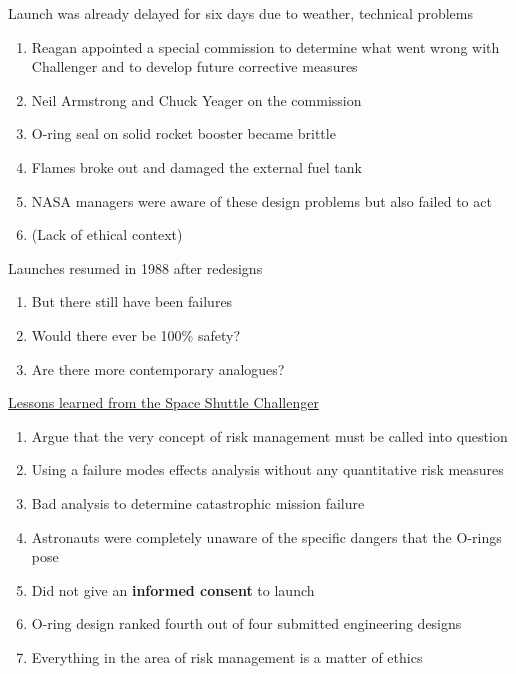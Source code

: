 \documentclass[aspectratio=1610,pdftex,dvipsnames,compress,xcolor={dvipsnames}]{beamer}
\begin{document}
\begin{frame}{Launch was already delayed for six days due to weather, technical problems}
    \begin{enumerate}[series=outerlist,topsep=0pt,itemsep=21pt,leftmargin=*,label=(\arabic*)]
        \item[]Reagan appointed a special commission to determine what went wrong with Challenger and to develop future corrective measures  
        \item[]Neil Armstrong and Chuck Yeager on the commission
        \item[]O-ring seal on solid rocket booster became brittle  
        \item[]Flames broke out and damaged the external fuel tank  
        \item[]NASA managers were aware of these design problems but also failed to act  
        \item[](Lack of ethical context)
    \end{enumerate}
\end{frame}


\begin{frame}{Launches resumed in 1988 after redesigns}
    \begin{enumerate}[series=outerlist,topsep=0pt,itemsep=21pt,leftmargin=*,label=(\arabic*)]
        \item[]But there still have been failures  
        \item[]Would there ever be 100\% safety?
        \item[]Are there more contemporary analogues?
    \end{enumerate}
\end{frame}


\begin{frame}{\href{https://uidaho.pressbooks.pub/riskassessment/chapter/contemporary-cases-in-risk-assessment-2/}{Lessons learned from the Space Shuttle Challenger}}
    \begin{enumerate}[series=outerlist,topsep=0pt,itemsep=15pt,leftmargin=*,label=(\arabic*)]
        \item[]Argue that the very concept of risk management must be called into question  
        \item[]Using a failure modes effects analysis without any quantitative risk measures
        \item[]Bad analysis to determine catastrophic mission failure
        \item[]Astronauts were completely unaware of the specific dangers that the O-rings pose  
        \item[]Did not give an \textbf{informed consent} to launch
        \item[]O-ring design ranked fourth out of four submitted engineering designs
        \item[]Everything in the area of risk management is a matter of ethics
    \end{enumerate}
\end{frame}
\end{document}
